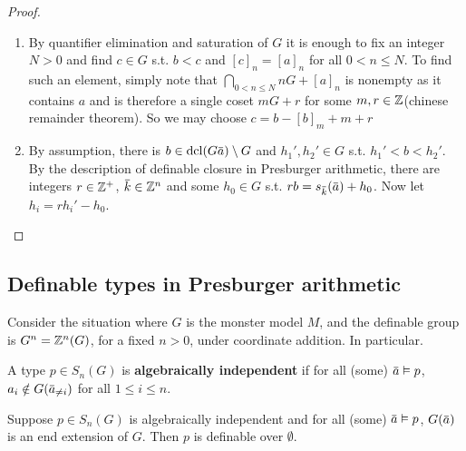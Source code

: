 \documentclass[11pt]{article}
\begin{document}
\begin{proof}
\begin{enumerate}
\item By quantifier elimination and saturation of \(G\) it is enough to fix an integer \(N>0\) and
find \(c\in G\) s.t. \(b<c\) and \([c]_n=[a]_n\) for all \(0<n\le N\). To find such an element,
simply note that \(\bigcap_{0<n\le N}nG+[a]_n\) is nonempty as it contains \(a\) and is therefore a
single coset \(mG+r\) for some \(m,r\in\mathbb{Z}\)(chinese remainder theorem). So we may
choose \(c=b-[b]_m+m+r\)
\item By assumption, there is \(b\in\dcl(G\bara)\setminus G\) and \(h_1',h_2'\in G\) s.t. \(h_1'<b<h_2'\). By the
description of definable closure in Presburger arithmetic, there are
integers \(r\in\mathbb{Z}^+\), \(\bark\in\Z^n\) and some \(h_0\in G\) s.t. \(rb=s_{\bark}(\bara)+h_0\). Now
let \(h_i=rh_i'-h_0\).
\end{enumerate}
\end{proof}
\subsection{Definable types in Presburger arithmetic}
\label{sec:orgca2a756}
Consider the situation where \(G\) is the monster model \(M\), and the definable group
is \(G^n=\mathbb{Z}^n(G)\), for a fixed \(n>0\), under coordinate addition. In particular.

\begin{definition}[]
A type \(p\in S_n(G)\) is \textbf{algebraically independent} if for all
(some) \(\bara\vDash p\), \(a_i\notin G(\bara_{\neq i})\) for all \(1\le i\le n\).
\end{definition}

\begin{lemma}[]
\label{0.6}
Suppose \(p\in S_n(G)\) is algebraically independent and for all (some) \(\bara\vDash p\), \(G(\bara)\)
is an end extension of \(G\). Then \(p\) is definable over \(\emptyset\).
\end{lemma}
\end{document}
